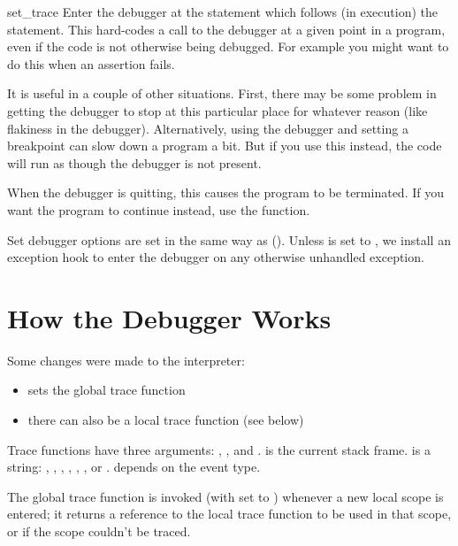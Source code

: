 \begin{funcdesc}{set_trace}{}\label{set-trace}
Enter the debugger at the statement which follows (in execution) the
 statement. This hard-codes a call to the debugger
at a given point in a program, even if the code is not otherwise being
debugged. For example you might want to do this when an assertion
fails.

It is useful in a couple of other situations. First, there may be some
problem in getting the debugger to stop at this particular place for
whatever reason (like flakiness in the debugger). Alternatively, using
the debugger and setting a breakpoint can slow down a program a
bit. But if you use this instead, the code will run as though the
debugger is not present.

When the debugger is quitting, this causes the program to be
terminated. If you want the program to continue instead, use the
 function.

Set debugger options are set in the same way as ().
Unless  is set to , we install an
exception hook to enter the debugger on any otherwise unhandled
exception.

\end{funcdesc}

\section{How the Debugger Works \label{debugger-hooks}}

Some changes were made to the interpreter:

\begin{itemize}
\item {} sets the global trace function
\item there can also be a local trace function (see below)
\end{itemize}

Trace functions have three arguments: , , and
.  is the current stack frame.   is a
string: , , , ,
 , , or . 
 depends on the event type.

The global trace function is invoked (with  set to
) whenever a new local scope is entered; it returns
a reference to the local trace function to be used in that scope, or
 if the scope couldn't be traced.

